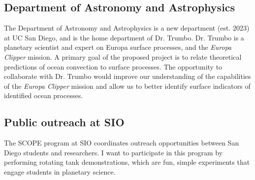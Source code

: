 \documentclass[12pt]{article}
\begin{document}
\subsection*{Department of Astronomy and Astrophysics}
The Department of Astronomy and Astrophysics is a new department (est. 2023) at UC San Diego, and is the home department of Dr. Trumbo. Dr. Trumbo is a planetary scientist and expert on Europa surface processes, and the \textit{Europa Clipper} mission. 
A primary goal of the proposed project is to relate theoretical predictions of ocean convection to surface processes. The opportunity to collaborate with Dr. Trumbo would improve our understanding of the capabilities of the \textit{Europa Clipper} mission and allow us to better identify surface indicators of identified ocean processes.
\subsection*{Public outreach at SIO}
The SCOPE program at SIO coordinates outreach opportunities between San Diego students and researchers. 
I want to participate in this program by performing rotating tank demonstrations, which are fun, simple experiments that engage students in planetary science.
\printbibliography
\end{document}
